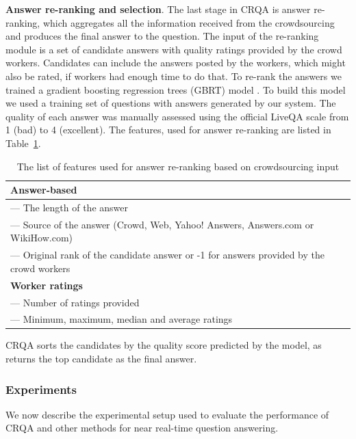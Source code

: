 \textbf{Answer re-ranking and selection}.
The last stage in CRQA is answer re-ranking, which aggregates all the information received from the crowdsourcing and produces the final answer to the question.
The input of the re-ranking module is a set of candidate answers with quality ratings provided by the crowd workers.
Candidates can include the answers posted by the workers, which might also be rated, if workers had enough time to do that.
To re-rank the answers we trained a gradient boosting regression trees (GBRT) model \cite{friedman2002stochastic}.
To build this model we used a training set of questions with answers generated by our system.
The quality of each answer was manually assessed using the official LiveQA scale from 1 (bad) to 4 (excellent).
The features, used for answer re-ranking are listed in Table~\ref{table:crowdsourcing:crqa:reranking_features}.

\begin{table}[ht]
\centering
\begin{tabular}{| p{15cm} |}
\hline
\textbf{Answer-based} \\
\hline
--- The length of the answer \\
--- Source of the answer (Crowd, Web, Yahoo! Answers, Answers.com or WikiHow.com)\\
--- Original rank of the candidate answer or -1 for answers provided by the crowd workers\\
\hline
\textbf{Worker ratings} \\
\hline
--- Number of ratings provided\\
--- Minimum, maximum, median and average ratings\\
\hline
\end{tabular}
\caption{The list of features used for answer re-ranking based on crowdsourcing input}
\label{table:crowdsourcing:crqa:reranking_features}
\end{table}

CRQA sorts the candidates by the quality score predicted by the model, as returns the top candidate as the final answer.


\subsubsection{Experiments}
\label{section:crowdsourcing:approach:crqa:experiments}


We now describe the experimental setup used to evaluate the performance of CRQA and other methods for near real-time question answering.

